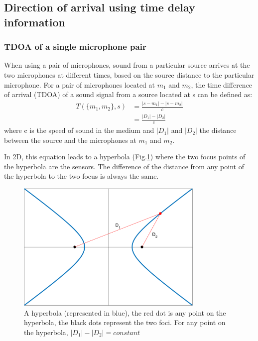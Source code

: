 \subsection{Direction of arrival using time delay information}

\subsubsection{TDOA of a single microphone pair}\label{sec:TDOA}

When using a pair of microphones, sound from a particular source arrives at the two microphones at different times, based on the source distance to the particular microphone. For a pair of microphones located at $m_{1}$ and $m_{2}$, the time difference of arrival (TDOA) of a sound signal from a source located at s can be defined as:
\begin{equation}
    \begin{split}
    T(\{m_{1},m_{2}\},s)&=\frac{|s-m_{1}|-|s-m_{2}|}{c}\\
                        &=\frac{|D_{1}|-|D_{2}|}{c}
    \label{eq:tdoa}
    \end{split}
\end{equation}
where c is the speed of sound in the medium and $|D_{1}|$ and $|D_{2}|$ the distance between the source and the microphones at $m_1$ and $m_2$.

In 2D, this equation leads to a hyperbola (Fig.\ref{eq:tdoa}) where the two focus points of the hyperbola are the sensors. The difference of the distance from any point of the hyperbola to the two focus is always the same.

\begin{figure}[H]
    \centering
    \includegraphics[width=0.8\textwidth]{Figures/hyperbola.png}
    \caption{A hyperbola (represented in blue), the red dot is any point on the hyperbola, the black dots represent the two foci. For any point on the hyperbola, $|D_1|-|D_2| = constant$}
    \label{eq:tdoa}
\end{figure}

